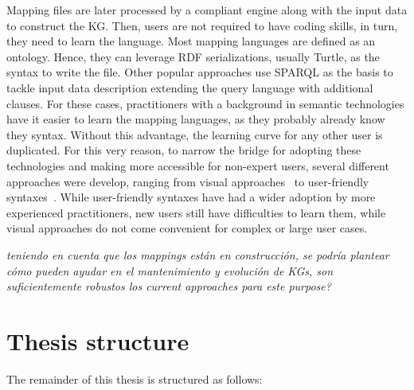 Mapping files are later processed by a compliant engine along with the input data to construct the KG. Then, users are not required to have coding skills, in turn, they need to learn the language. Most mapping languages are defined as an ontology. Hence, they can leverage RDF serializations, usually Turtle, as the syntax to write the file. Other popular approaches use SPARQL as the basis to tackle input data description extending the query language with additional clauses. For these cases, practitioners with a background in semantic technologies have it easier to learn the mapping languages, as they probably already know they syntax. Without this advantage, the learning curve for any other user is duplicated. For this very reason, to narrow the bridge for adopting these technologies and making more accessible for non-expert users, several different approaches were develop, ranging from visual approaches~\citep{} to user-friendly syntaxes~\citep{}. While user-friendly syntaxes have had a wider adoption by more experienced practitioners, new users still have difficulties to learn them, while visual approaches do not come convenient for complex or large user cases. 

\textit{ teniendo en cuenta que los mappings están en construcción, se podría plantear cómo pueden ayudar en el mantenimiento y evolución de KGs, son suficientemente robustos los current approaches para este purpose?}



\section{Thesis structure}

The remainder of this thesis is structured as follows:

